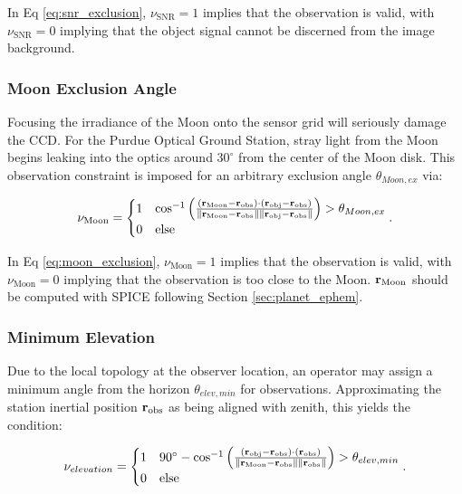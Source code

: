 In Eq \ref{eq:snr_exclusion}, $\nu_{\mathrm{SNR}} = 1$ implies that the observation is valid, with $\nu_{\mathrm{SNR}} = 0$ implying that the object signal cannot be discerned from the image background.

\subsubsection{Moon Exclusion Angle}

Focusing the irradiance of the Moon onto the sensor grid will seriously damage the CCD. For the Purdue Optical Ground Station, stray light from the Moon begins leaking into the optics around $30^\circ$ from the center of the Moon disk. This observation constraint is imposed for an arbitrary exclusion angle $\theta_{Moon,ex}$ via:

\begin{equation} \label{eq:moon_exclusion}
  \nu_\mathrm{Moon} = \begin{cases}
    1 & \cos^{-1}\left( \frac{\left( \mathbf{r}_\mathrm{Moon} - \mathbf{r}_\mathrm{obs} \right) \cdot \left( \mathbf{r}_\mathrm{obj} - \mathbf{r}_\mathrm{obs} \right)}{\| \mathbf{r}_\mathrm{Moon} - \mathbf{r}_\mathrm{obs} \| \| \mathbf{r}_\mathrm{obj} - \mathbf{r}_\mathrm{obs} \|} \right) > \theta_{Moon,ex}\\
    0 & \mathrm{else}
  \end{cases}.
\end{equation}

In Eq \ref{eq:moon_exclusion}, $\nu_\mathrm{Moon} = 1$ implies that the observation is valid, with $\nu_\mathrm{Moon} = 0$ implying that the observation is too close to the Moon. $\mathbf{r}_\mathrm{Moon}$ should be computed with SPICE following Section \ref{sec:planet_ephem}.

\subsubsection{Minimum Elevation}

Due to the local topology at the observer location, an operator may assign a minimum angle from the horizon $\theta_{elev,min}$ for observations. Approximating the station inertial position $\mathbf{r}_\mathrm{obs}$ as being aligned with zenith, this yields the condition:


\begin{equation} \label{eq:elevation_exclusion}
  \nu_{elevation} = \begin{cases}
    1 & 90^\circ - \cos^{-1}\left( \frac{\left( \mathbf{r}_\mathrm{obj} - \mathbf{r}_\mathrm{obs} \right) \cdot \left( \mathbf{r}_\mathrm{obs} \right)}{\| \mathbf{r}_\mathrm{Moon} - \mathbf{r}_\mathrm{obs} \| \| \mathbf{r}_\mathrm{obs} \|} \right) > \theta_{elev,min}\\
    0 & \mathrm{else}
  \end{cases}.
\end{equation}

